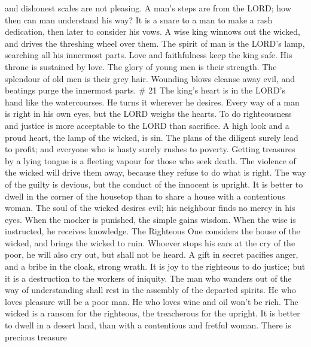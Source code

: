 and dishonest scales are not pleasing.  A man's steps are
from the LORD; how then can man understand his way?  It is
a snare to a man to make a rash dedication, then later to consider his
vows.  A wise king winnows out the wicked, and drives the
threshing wheel over them.  The spirit of man is the LORD's
lamp, searching all his innermost parts.  Love and
faithfulness keep the king safe. His throne is sustained by love.
 The glory of young men is their strength. The splendour of
old men is their grey hair.  Wounding blows cleanse away
evil, and beatings purge the innermost parts. \# 21  The
king's heart is in the LORD's hand like the watercourses. He turns it
wherever he desires.  Every way of a man is right in his own
eyes, but the LORD weighs the hearts.  To do righteousness
and justice is more acceptable to the LORD than sacrifice. 
A high look and a proud heart, the lamp of the wicked, is sin.
 The plans of the diligent surely lead to profit; and
everyone who is hasty surely rushes to poverty.  Getting
treasures by a lying tongue is a fleeting vapour for those who seek
death.  The violence of the wicked will drive them away,
because they refuse to do what is right.  The way of the
guilty is devious, but the conduct of the innocent is upright.
 It is better to dwell in the corner of the housetop than to
share a house with a contentious woman.  The soul of the
wicked desires evil; his neighbour finds no mercy in his eyes.
 When the mocker is punished, the simple gains wisdom. When
the wise is instructed, he receives knowledge.  The
Righteous One considers the house of the wicked, and brings the wicked
to ruin.  Whoever stops his ears at the cry of the poor, he
will also cry out, but shall not be heard.  A gift in
secret pacifies anger, and a bribe in the cloak, strong wrath.
 It is joy to the righteous to do justice; but it is a
destruction to the workers of iniquity.  The man who
wanders out of the way of understanding shall rest in the assembly of
the departed spirits.  He who loves pleasure will be a poor
man. He who loves wine and oil won't be rich.  The wicked
is a ransom for the righteous, the treacherous for the upright.
 It is better to dwell in a desert land, than with a
contentious and fretful woman.  There is precious treasure
